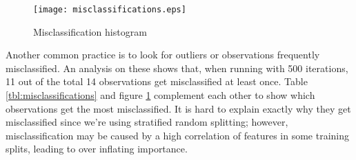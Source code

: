 \begin{figure}
	\centering
	\texttt{[image: misclassifications.eps]}
	\caption{Misclassification histogram}
	\label{fig:misclassifications}
\end{figure}

Another common practice is to look for outliers or observations frequently misclassified. An analysis on these shows that, when running with 500 iterations, 11 out of the total 14 observations get misclassified at least once. Table \ref{tbl:misclassifications} and figure \ref{fig:misclassifications} complement each other to show which observations get the most misclassified. It is hard to explain exactly why they get misclassified since we're using stratified random splitting; however, misclassification may be caused by a high correlation of features in some training splits, leading to over inflating importance.